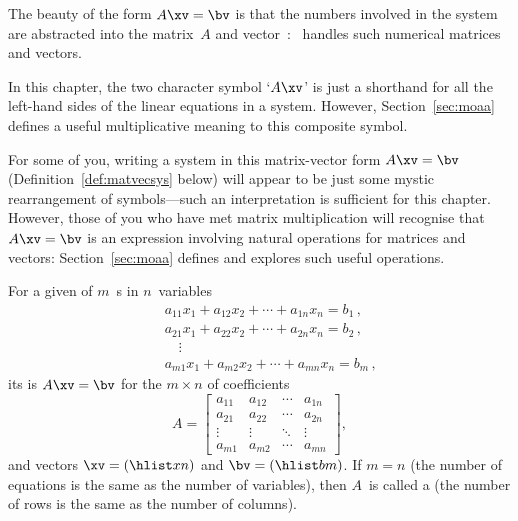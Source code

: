 The beauty of the form \(A\xv=\bv\) is that the numbers involved in the system are abstracted into the matrix~\(A\) and vector~\bv: \script\ handles such numerical matrices and vectors.
\begin{aside}
In this chapter, the two character symbol `\(A\xv\)' is just a shorthand for all the left-hand sides of the linear equations in a system.
However, Section~\ref{sec:moaa} defines a useful multiplicative meaning to this composite symbol. 
\end{aside}%
For some of you, writing a system in this matrix-vector form \(A\xv=\bv\) (Definition~\ref{def:matvecsys} below) will appear to be just some mystic rearrangement of symbols---such an interpretation is sufficient for this chapter.
However, those of you who have met matrix multiplication will recognise that \(A\xv=\bv\) is an expression involving natural operations for matrices and vectors: Section~\ref{sec:moaa} defines and explores such useful operations.

\begin{definition} \label{def:matvecsys}
For a given  of \(m\)~s in \(n\)~variables
\begin{eqnarray*}
&&a_{11}x_1+a_{12}x_2+\cdots+a_{1n}x_n=b_1\,,
\\&&a_{21}x_1+a_{22}x_2+\cdots+a_{2n}x_n=b_2\,,
\\&&\quad\vdots
\\&&a_{m1}x_1+a_{m2}x_2+\cdots+a_{mn}x_n=b_m\,,
\end{eqnarray*}
its  is \(A\xv=\bv\) for the \(m\times n\)  of coefficients
\begin{equation*}
A=\begin{bmatrix} a_{11}&a_{12}&\cdots&a_{1n}
\\a_{21}&a_{22}&\cdots&a_{2n}
\\\vdots&\vdots&\ddots&\vdots
\\a_{m1}&a_{m2}&\cdots&a_{mn} \end{bmatrix},
\end{equation*}
and vectors \(\xv=(\hlist xn)\) and \(\bv=(\hlist bm)\).
If \(m=n\) (the number of equations is the same as the number of variables), then \(A\)~is called a  (the number of rows is the same as the number of columns).
\end{definition}


